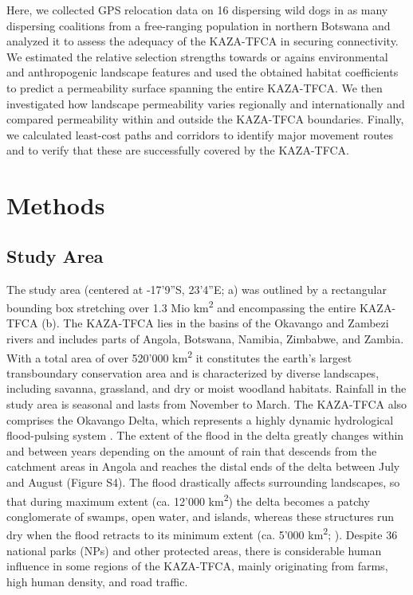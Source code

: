 \documentclass[abstract=on,10pt,a4paper,bibliography=totocnumbered]{article}
\begin{document}
Here, we collected GPS relocation data on 16 dispersing wild dogs in as many
dispersing coalitions from a free-ranging population in northern Botswana and
analyzed it to assess the adequacy of the KAZA-TFCA in securing connectivity. We
estimated the relative selection strengths towards or agains
environmental and anthropogenic landscape features and used the obtained habitat
coefficients to predict a permeability surface spanning the entire KAZA-TFCA. We
then investigated how landscape permeability varies regionally and
internationally and compared permeability within and outside the KAZA-TFCA
boundaries. Finally, we calculated least-cost paths and corridors to identify
major movement routes and to verify that these are successfully covered by the
KAZA-TFCA.

\section{Methods}
\subsection{Study Area}
The study area (centered at -17'9''S, 23'4''E;
a) was outlined by a rectangular bounding box stretching over
1.3 Mio km\textsuperscript{2} and encompassing the entire KAZA-TFCA
(b). The KAZA-TFCA lies in the basins of the Okavango and
Zambezi rivers and includes parts of Angola, Botswana, Namibia, Zimbabwe, and
Zambia. With a total area of over 520'000 km\textsuperscript{2} it constitutes
the earth's largest transboundary conservation area and is characterized by
diverse landscapes, including savanna, grassland, and dry or moist woodland
habitats. Rainfall in the study area is seasonal and lasts from November to
March. The KAZA-TFCA also comprises the Okavango Delta, which represents a
highly dynamic hydrological flood-pulsing system \citep{McNutt.1996,
Wolski.2017}. The extent of the flood in the delta greatly changes within and
between years depending on the amount of rain that descends from the catchment
areas in Angola and reaches the distal ends of the delta between July and August
(Figure S4). The flood drastically affects surrounding landscapes, so that
during maximum extent (ca. 12'000 km\textsuperscript{2}) the delta becomes a
patchy conglomerate of swamps, open water, and islands, whereas these structures
run dry when the flood retracts to its minimum extent (ca. 5'000
km\textsuperscript{2}; \citealp{Wolski.2017}). Despite 36 national parks (NPs)
and other protected areas, there is considerable human influence in some regions
of the KAZA-TFCA, mainly originating from farms, high human density, and road
traffic.
\end{document}
